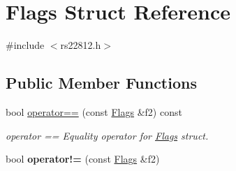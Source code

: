 \hypertarget{structFlags}{\section{Flags Struct Reference}
\label{structFlags}
}


{\ttfamily \#include $<$rs22812.\-h$>$}

\subsection*{Public Member Functions}
\begin{DoxyCompactItemize}
\item 
bool \hyperlink{structFlags_adc9e557a0b9b87c6d19963480ee88cf3}{operator==} (const \hyperlink{structFlags}{Flags} \&f2) const 
\begin{DoxyCompactList}\small\item\em operator == Equality operator for \hyperlink{structFlags}{Flags} struct. \end{DoxyCompactList}\item 
\hypertarget{structFlags_a35a9bea4730ee6c5e98a7d08110c8692}{bool {\bfseries operator!=} (const \hyperlink{structFlags}{Flags} \&f2)}\label{structFlags_a35a9bea4730ee6c5e98a7d08110c8692}

\end{DoxyCompactItemize}
